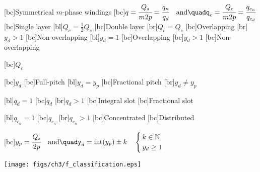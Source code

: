 \begin{psfrags}%
\psfragscanon

[bc]{Symmetrical $m$-phase windings}
[bc]{$%
                         q=\cfrac{Q_s}{m2p}=\cfrac{q_n}{q_d}%
                         \quad%
                         \mbox{and}%
                         \quad%
                         q_c=\cfrac{Q_c}{m2p}=\cfrac{q_{c_n}}{q_{c_d}}%
                        $}
[bc]{Single layer}
[bl]{$Q_c=\frac{1}{2}Q_s$}
[bc]{Double layer}
[br]{$Q_c=Q_s$}
[bc]{Overlapping}
[br]{$y_d>1$}
[bc]{Non-overlapping}
[bl]{$y_d=1$}
[bc]{Overlapping}
[bc]{$y_d>1$}
[bc]{Non-overlapping}

[bc]{$Q_c$}

[bc]{$y_d$}
[bc]{Full-pitch}
[bl]{$y_d=y_p$}
[bc]{Fractional pitch}
[br]{$y_d \neq y_p$}

[bl]{$q_d=1$}
[bc]{$q_d$}
[br]{$q_d>1$}
[bc]{Integral slot}
[bc]{Fractional slot}

[bl]{$q_{c_n}=1$}
[bc]{$q_{c_n}$}
[br]{$q_{c_n}>1$}
[bc]{Concentrated}
[bc]{Distributed}

[bc]{$y_p=\cfrac{Q_s}{2p}%
                    \quad%
                    \mbox{and}%
                    \quad%
                    y_d=\mbox{int}(y_p) \pm k%
                    \quad%
                    \begin{cases}%
                      k \in \mathbb{N}\\%
                      y_d \geq 1%
                    \end{cases}$
                  }

\texttt{[image: figs/ch3/f\_classification.eps]}
\end{psfrags}%